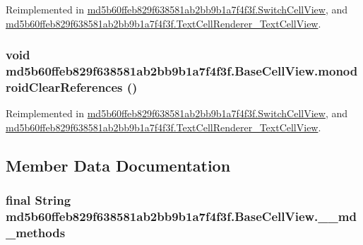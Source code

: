 Reimplemented in \hyperlink{classmd5b60ffeb829f638581ab2bb9b1a7f4f3f_1_1_switch_cell_view_6526a7d8e09d4f580f9ba2058b1a31b7}{md5b60ffeb829f638581ab2bb9b1a7f4f3f.SwitchCellView}, and \hyperlink{classmd5b60ffeb829f638581ab2bb9b1a7f4f3f_1_1_text_cell_renderer___text_cell_view_fc8a91c0d40ccce034289e75cb64e36a}{md5b60ffeb829f638581ab2bb9b1a7f4f3f.TextCellRenderer\_\-TextCellView}.\hypertarget{classmd5b60ffeb829f638581ab2bb9b1a7f4f3f_1_1_base_cell_view_bd00d7bfaf56776cb2df98366ee775d7}{
\subsubsection[{monodroidClearReferences}]{\setlength{\rightskip}{0pt plus 5cm}void md5b60ffeb829f638581ab2bb9b1a7f4f3f.BaseCellView.monodroidClearReferences ()}}
\label{classmd5b60ffeb829f638581ab2bb9b1a7f4f3f_1_1_base_cell_view_bd00d7bfaf56776cb2df98366ee775d7}




Reimplemented in \hyperlink{classmd5b60ffeb829f638581ab2bb9b1a7f4f3f_1_1_switch_cell_view_c5c13d6e582a1a4005ce2de3fba31e9e}{md5b60ffeb829f638581ab2bb9b1a7f4f3f.SwitchCellView}, and \hyperlink{classmd5b60ffeb829f638581ab2bb9b1a7f4f3f_1_1_text_cell_renderer___text_cell_view_8a90317f45055f6bdc8b99196ff5d3c5}{md5b60ffeb829f638581ab2bb9b1a7f4f3f.TextCellRenderer\_\-TextCellView}.

\subsection{Member Data Documentation}
\hypertarget{classmd5b60ffeb829f638581ab2bb9b1a7f4f3f_1_1_base_cell_view_b45ff8d3fd40dd0e56aafff804b441ea}{
\subsubsection[{\_\-\_\-md\_\-methods}]{\setlength{\rightskip}{0pt plus 5cm}final String {\bf md5b60ffeb829f638581ab2bb9b1a7f4f3f.BaseCellView.\_\-\_\-md\_\-methods}}}
\label{classmd5b60ffeb829f638581ab2bb9b1a7f4f3f_1_1_base_cell_view_b45ff8d3fd40dd0e56aafff804b441ea}




